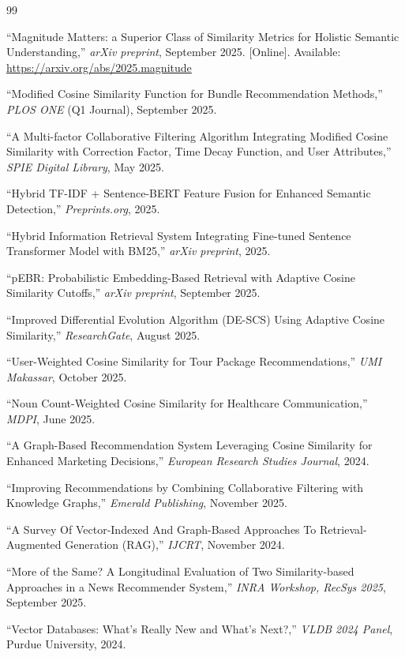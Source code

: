 \documentclass[12pt,a4paper]{article}
\begin{document}
\begin{thebibliography}{99}

``Magnitude Matters: a Superior Class of Similarity Metrics for Holistic Semantic Understanding,'' \textit{arXiv preprint}, September 2025. [Online]. Available: \url{https://arxiv.org/abs/2025.magnitude}

``Modified Cosine Similarity Function for Bundle Recommendation Methods,'' \textit{PLOS ONE} (Q1 Journal), September 2025.

``A Multi-factor Collaborative Filtering Algorithm Integrating Modified Cosine Similarity with Correction Factor, Time Decay Function, and User Attributes,'' \textit{SPIE Digital Library}, May 2025.

``Hybrid TF-IDF + Sentence-BERT Feature Fusion for Enhanced Semantic Detection,'' \textit{Preprints.org}, 2025.

``Hybrid Information Retrieval System Integrating Fine-tuned Sentence Transformer Model with BM25,'' \textit{arXiv preprint}, 2025.

``pEBR: Probabilistic Embedding-Based Retrieval with Adaptive Cosine Similarity Cutoffs,'' \textit{arXiv preprint}, September 2025.

``Improved Differential Evolution Algorithm (DE-SCS) Using Adaptive Cosine Similarity,'' \textit{ResearchGate}, August 2025.

``User-Weighted Cosine Similarity for Tour Package Recommendations,'' \textit{UMI Makassar}, October 2025.

``Noun Count-Weighted Cosine Similarity for Healthcare Communication,'' \textit{MDPI}, June 2025.

``A Graph-Based Recommendation System Leveraging Cosine Similarity for Enhanced Marketing Decisions,'' \textit{European Research Studies Journal}, 2024.

``Improving Recommendations by Combining Collaborative Filtering with Knowledge Graphs,'' \textit{Emerald Publishing}, November 2025.

``A Survey Of Vector-Indexed And Graph-Based Approaches To Retrieval-Augmented Generation (RAG),'' \textit{IJCRT}, November 2024.

``More of the Same? A Longitudinal Evaluation of Two Similarity-based Approaches in a News Recommender System,'' \textit{INRA Workshop, RecSys 2025}, September 2025.

``Vector Databases: What's Really New and What's Next?,'' \textit{VLDB 2024 Panel}, Purdue University, 2024.

\end{thebibliography}
\end{document}
